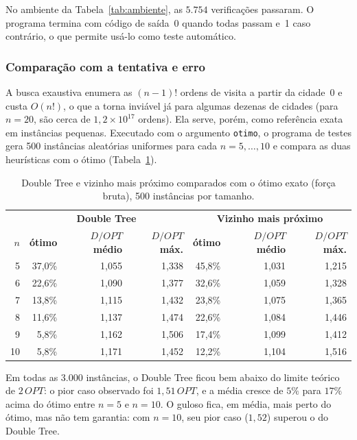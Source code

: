 \documentclass[11pt,a4paper]{article}
\newcommand{\cab}[1]{\leavevmode\color{white}\bfseries #1}
\newcommand{\fioCabecalho}{\arrayrulecolor{tabFio}\specialrule{1.2pt}{0pt}{0pt}\arrayrulecolor{eachTeal}}
\renewcommand{\_}{\underscoreoriginal\allowbreak}
\begin{document}
No ambiente da Tabela~\ref{tab:ambiente}, as $5.754$ verificações
passaram. O programa termina com código de saída~0 quando todas passam
e~1 caso contrário, o que permite usá-lo como teste automático.

\subsubsection{Comparação com a tentativa e erro}
\label{sec:forcabruta}

A busca exaustiva enumera as $(n-1)!$ ordens de visita a partir da
cidade~0 e custa $O(n!)$, o que a torna inviável já para algumas
dezenas de cidades (para $n=20$, são cerca de $1{,}2\times10^{17}$
ordens). Ela serve, porém, como referência exata em instâncias
pequenas. Executado com o argumento \texttt{otimo}, o programa de
testes gera 500 instâncias aleatórias uniformes para cada
$n=5,\dots,10$ e compara as duas heurísticas com o ótimo
(Tabela~\ref{tab:forcabruta}).

\begin{table}[H]
\centering
\caption{Double Tree e vizinho mais próximo comparados com o ótimo exato (força bruta), 500 instâncias por tamanho.}
\label{tab:forcabruta}
\begin{tabular}{r r r r r r r}
\toprule
\rowcolor{tabCabecalho}
 & \multicolumn{3}{c}{\cab{Double Tree}} & \multicolumn{3}{c}{\cab{Vizinho mais próximo}}\\
\rowcolor{tabCabecalho}
\cab{$n$} & \cab{ótimo} & \cab{$D/OPT$ médio} & \cab{$D/OPT$ máx.} & \cab{ótimo} & \cab{$D/OPT$ médio} & \cab{$D/OPT$ máx.}\\
\fioCabecalho
5 & 37{,}0\% & 1{,}055 & 1{,}338 & 45{,}8\% & 1{,}031 & 1{,}215 \\
6 & 22{,}6\% & 1{,}090 & 1{,}377 & 32{,}6\% & 1{,}059 & 1{,}328 \\
7 & 13{,}8\% & 1{,}115 & 1{,}432 & 23{,}8\% & 1{,}075 & 1{,}365 \\
8 & 11{,}6\% & 1{,}137 & 1{,}474 & 22{,}6\% & 1{,}084 & 1{,}446 \\
9 & 5{,}8\% & 1{,}162 & 1{,}506 & 17{,}4\% & 1{,}099 & 1{,}412 \\
10 & 5{,}8\% & 1{,}171 & 1{,}452 & 12{,}2\% & 1{,}104 & 1{,}516 \\
\bottomrule
\end{tabular}
\end{table}

Em todas as 3.000 instâncias, o Double Tree ficou bem abaixo do limite
teórico de $2\,OPT$: o pior caso observado foi $1{,}51\,OPT$, e a média
cresce de $5\%$ para $17\%$ acima do ótimo entre $n=5$ e $n=10$. O
guloso fica, em média, mais perto do ótimo, mas não tem garantia: com
$n=10$, seu pior caso ($1{,}52$) superou o do Double Tree.
\end{document}
